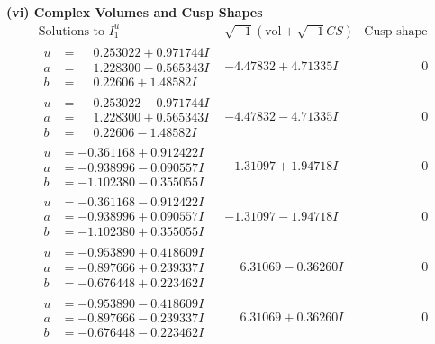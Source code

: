 \documentclass[1p]{elsarticle_modified}
\theoremstyle{definition}
\newcommand{\I}{\sqrt{-1}}
\begin{document}
\newpage\flushleft \textbf{(vi) Complex Volumes and Cusp Shapes}
$$\begin{array}{c|c|c}  
\text{Solutions to }I^u_{1}& \I (\text{vol} + \sqrt{-1}CS) & \text{Cusp shape}\\
 \hline 
\begin{aligned}
u &= \phantom{-}0.253022 + 0.971744 I \\
a &= \phantom{-}1.228300 - 0.565343 I \\
b &= \phantom{-}0.22606 + 1.48582 I\end{aligned}
 & -4.47832 + 4.71335 I & \phantom{-0.000000 } 0 \\ \hline\begin{aligned}
u &= \phantom{-}0.253022 - 0.971744 I \\
a &= \phantom{-}1.228300 + 0.565343 I \\
b &= \phantom{-}0.22606 - 1.48582 I\end{aligned}
 & -4.47832 - 4.71335 I & \phantom{-0.000000 } 0 \\ \hline\begin{aligned}
u &= -0.361168 + 0.912422 I \\
a &= -0.938996 - 0.090557 I \\
b &= -1.102380 - 0.355055 I\end{aligned}
 & -1.31097 + 1.94718 I & \phantom{-0.000000 } 0 \\ \hline\begin{aligned}
u &= -0.361168 - 0.912422 I \\
a &= -0.938996 + 0.090557 I \\
b &= -1.102380 + 0.355055 I\end{aligned}
 & -1.31097 - 1.94718 I & \phantom{-0.000000 } 0 \\ \hline\begin{aligned}
u &= -0.953890 + 0.418609 I \\
a &= -0.897666 + 0.239337 I \\
b &= -0.676448 + 0.223462 I\end{aligned}
 & \phantom{-}6.31069 - 0.36260 I & \phantom{-0.000000 } 0 \\ \hline\begin{aligned}
u &= -0.953890 - 0.418609 I \\
a &= -0.897666 - 0.239337 I \\
b &= -0.676448 - 0.223462 I\end{aligned}
 & \phantom{-}6.31069 + 0.36260 I & \phantom{-0.000000 } 0 \\ \hline\begin{aligned}

\end{aligned}
\end{array}$$
\end{document}
